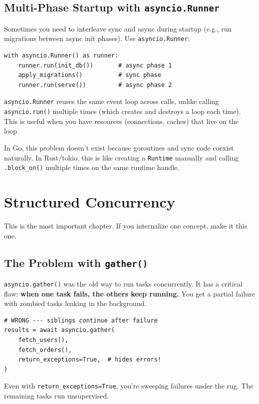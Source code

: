 \documentclass[11pt,a4paper,oneside]{book}
\newcommand{\py}[1]{\texttt{\color{pyblue}#1}}
\newcommand{\rustcode}[1]{\texttt{\color{BrickRed}#1}}
\begin{document}
\section{Multi-Phase Startup with \py{asyncio.Runner}}

Sometimes you need to interleave sync and async during startup (e.g., run migrations between
async init phases). Use \py{asyncio.Runner}:

\begin{lstlisting}[style=python]
with asyncio.Runner() as runner:
    runner.run(init_db())       # async phase 1
    apply_migrations()          # sync phase
    runner.run(serve())         # async phase 2
\end{lstlisting}

\begin{infobox}
\py{asyncio.Runner} reuses the same event loop across calls, unlike calling \py{asyncio.run()}
multiple times (which creates and destroys a loop each time). This is useful when you have
resources (connections, caches) that live on the loop.
\end{infobox}

\begin{analogybox}
In Go, this problem doesn't exist because goroutines and sync code coexist naturally. In Rust/tokio,
this is like creating a \rustcode{Runtime} manually and calling \texttt{.block\_on()} multiple times
on the same runtime handle.
\end{analogybox}

\chapter{Structured Concurrency}

This is the most important chapter. If you internalize one concept, make it this one.

\section{The Problem with \py{gather()}}

\py{asyncio.gather()} was the old way to run tasks concurrently. It has a critical flaw:
\textbf{when one task fails, the others keep running.} You get a partial failure with zombied
tasks leaking in the background.

\begin{dangerbox}[title={Never use \py{asyncio.gather()}}]
\begin{lstlisting}[style=python,numbers=none]
# WRONG --- siblings continue after failure
results = await asyncio.gather(
    fetch_users(),
    fetch_orders(),
    return_exceptions=True,  # hides errors!
)
\end{lstlisting}
Even with \py{return\_exceptions=True}, you're sweeping failures under the rug. The
remaining tasks run unsupervised.
\end{dangerbox}
\end{document}
